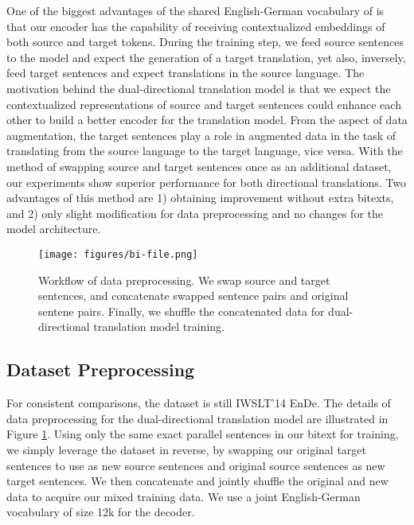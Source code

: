 \documentclass[11pt]{article}
\begin{document}
One of the biggest advantages of the shared English-German vocabulary of  is that our encoder has the capability of receiving contextualized embeddings of both source and target tokens. During the training step, we feed source sentences to the model and expect the generation of a target translation, yet also, inversely, feed target sentences and expect translations in the source language. The motivation behind the dual-directional translation model is that we expect the contextualized representations of source and target sentences could enhance each other to build a better encoder for the translation model. From the aspect of data augmentation, the target sentences play a role in augmented data in the task of translating from the source language to the target language, vice versa. With the method of swapping source and target sentences once as an additional dataset, our experiments show superior performance for both directional translations. Two advantages of this method are 1) obtaining improvement without extra bitexts, and 2) only slight modification for data preprocessing and no changes for the model architecture. 
\begin{figure}[t]
    \centering
    \texttt{[image: figures/bi-file.png]}
    \caption{Workflow of data preprocessing. We swap source and target sentences, and concatenate swapped sentence pairs and original sentene pairs. Finally, we shuffle the concatenated data for dual-directional translation model training.  }
    \label{fig:bi}
\end{figure}

\subsection{Dataset Preprocessing}
For consistent comparisons, the dataset is still IWSLT'14 EnDe. The details of data preprocessing for the dual-directional translation model are illustrated in Figure \ref{fig:bi}. Using only the same exact parallel sentences in our bitext for training, we simply leverage the dataset in reverse, by swapping our original target sentences to use as new source sentences and original source sentences as new target sentences. We then concatenate and jointly shuffle the original and new data to acquire our mixed training data. We use a joint English-German vocabulary of size 12k for the decoder. 
\end{document}
